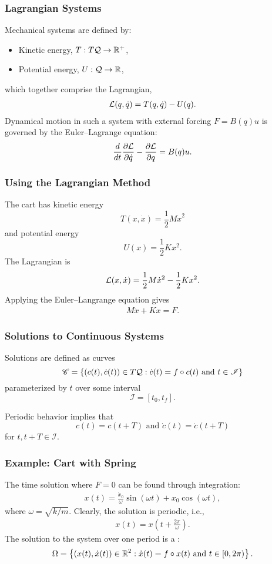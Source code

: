 \begin{frame}
  \frametitle{Lagrangian Systems}
  Mechanical systems are defined by:
  \begin{itemize}
  \item Kinetic energy, $T : T\mathcal{Q} \to \mathbb{R}^+$,
  \item Potential energy, $U : \mathcal{Q} \to \mathbb{R}$,
  \end{itemize}
  which together comprise the Lagrangian,
  \begin{align*}
    \mathcal{L}(q, \dot q) = T(q, \dot q) - U(q).
  \end{align*}
  Dynamical motion in such a system with external forcing $F = B(q) u$ is governed by the Euler--Lagrange equation:
  \begin{align*}
    \frac{d}{dt} \frac{\partial{\ensuremath{\mathcal{L}}}}{\partial{\ensuremath{\dot q}}} - \frac{\partial{\ensuremath{\mathcal{L}}}}{\partial{\ensuremath{q}}} = B(q) u.
  \end{align*}
\end{frame}

\begin{frame}
  \frametitle{Using the Lagrangian Method}
  The cart has kinetic energy $$T(x, {\dot x}) = \frac{1}{2} M {\dot x}^2$$ and potential energy $$U(x) = \frac{1}{2} K x^{2}.$$
  The Lagrangian is
  \begin{align*}
    \mathcal{L}(x, {\dot x}) = \frac{1}{2} M {\dot x}^2 - \frac{1}{2} K x^{2}.
  \end{align*}
  Applying the Euler--Langrange equation gives
  \begin{align*}
    M {\ddot x} + K x = F.
  \end{align*}
\end{frame}

\begin{frame}
  \frametitle{Solutions to Continuous Systems}
  Solutions are defined as curves $$\mathscr{C} = \left\{ (c(t), {\dot c(t)}) \in T\mathcal{Q} : \dot c(t) = f \circ c(t) \mbox{ and } t \in \mathscr{I} \right\}$$ parameterized by $t$ over some interval $$\mathscr{I} = [t_0, t_f].$$

  Periodic behavior implies that $$c(t) = c(t + T) \mbox{ and } {\dot c}(t) = {\dot c}(t + T)$$ for $t, t + T \in \mathscr{I}$.
\end{frame}

\begin{frame}
  \frametitle{Example: Cart with Spring}
  The time solution where $F = 0$ can be found through integration:
  \begin{align*}
    x(t) = \frac{{\dot x_{0}}}{\omega} \sin (\omega t) + x_{0} \cos (\omega t),
  \end{align*}
  where $\omega = \sqrt{k/m}$. Clearly, the solution is periodic, i.e.,
  \begin{align*}
    x(t) = x\left(t + \frac{2\pi}{\omega}\right).
  \end{align*}
  The solution to the system over one period is a :
  \begin{align*}
    \Omega = \left\{(x(t), \dot x(t)) \in \mathbb{R}^{2} : \dot x(t) = f \circ x(t) \mbox { and } t \in [0, 2\pi)\right\}.
  \end{align*}
\end{frame}

